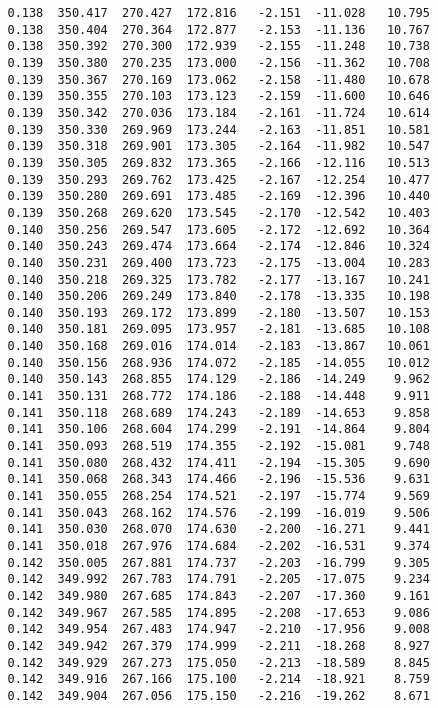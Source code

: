\begin{verbatim}
   0.138  350.417  270.427  172.816   -2.151  -11.028   10.795
   0.138  350.404  270.364  172.877   -2.153  -11.136   10.767
   0.138  350.392  270.300  172.939   -2.155  -11.248   10.738
   0.139  350.380  270.235  173.000   -2.156  -11.362   10.708
   0.139  350.367  270.169  173.062   -2.158  -11.480   10.678
   0.139  350.355  270.103  173.123   -2.159  -11.600   10.646
   0.139  350.342  270.036  173.184   -2.161  -11.724   10.614
   0.139  350.330  269.969  173.244   -2.163  -11.851   10.581
   0.139  350.318  269.901  173.305   -2.164  -11.982   10.547
   0.139  350.305  269.832  173.365   -2.166  -12.116   10.513
   0.139  350.293  269.762  173.425   -2.167  -12.254   10.477
   0.139  350.280  269.691  173.485   -2.169  -12.396   10.440
   0.139  350.268  269.620  173.545   -2.170  -12.542   10.403
   0.140  350.256  269.547  173.605   -2.172  -12.692   10.364
   0.140  350.243  269.474  173.664   -2.174  -12.846   10.324
   0.140  350.231  269.400  173.723   -2.175  -13.004   10.283
   0.140  350.218  269.325  173.782   -2.177  -13.167   10.241
   0.140  350.206  269.249  173.840   -2.178  -13.335   10.198
   0.140  350.193  269.172  173.899   -2.180  -13.507   10.153
   0.140  350.181  269.095  173.957   -2.181  -13.685   10.108
   0.140  350.168  269.016  174.014   -2.183  -13.867   10.061
   0.140  350.156  268.936  174.072   -2.185  -14.055   10.012
   0.140  350.143  268.855  174.129   -2.186  -14.249    9.962
   0.141  350.131  268.772  174.186   -2.188  -14.448    9.911
   0.141  350.118  268.689  174.243   -2.189  -14.653    9.858
   0.141  350.106  268.604  174.299   -2.191  -14.864    9.804
   0.141  350.093  268.519  174.355   -2.192  -15.081    9.748
   0.141  350.080  268.432  174.411   -2.194  -15.305    9.690
   0.141  350.068  268.343  174.466   -2.196  -15.536    9.631
   0.141  350.055  268.254  174.521   -2.197  -15.774    9.569
   0.141  350.043  268.162  174.576   -2.199  -16.019    9.506
   0.141  350.030  268.070  174.630   -2.200  -16.271    9.441
   0.141  350.018  267.976  174.684   -2.202  -16.531    9.374
   0.142  350.005  267.881  174.737   -2.203  -16.799    9.305
   0.142  349.992  267.783  174.791   -2.205  -17.075    9.234
   0.142  349.980  267.685  174.843   -2.207  -17.360    9.161
   0.142  349.967  267.585  174.895   -2.208  -17.653    9.086
   0.142  349.954  267.483  174.947   -2.210  -17.956    9.008
   0.142  349.942  267.379  174.999   -2.211  -18.268    8.927
   0.142  349.929  267.273  175.050   -2.213  -18.589    8.845
   0.142  349.916  267.166  175.100   -2.214  -18.921    8.759
   0.142  349.904  267.056  175.150   -2.216  -19.262    8.671

\end{verbatim}
